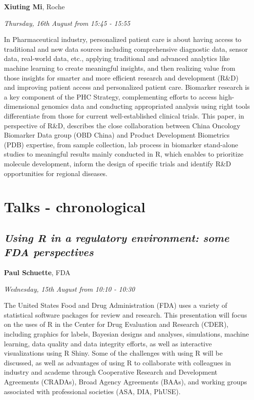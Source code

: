 \documentclass[]{book}
\theoremstyle{definition}
\theoremstyle{definition}
\theoremstyle{definition}
\theoremstyle{remark}
\begin{document}
\textbf{Xiuting Mi}, Roche

\emph{Thursday, 16th August from 15:45 - 15:55}

In Pharmaceutical industry, personalized patient care is about having
access to traditional and new data sources including comprehensive
diagnostic data, sensor data, real-world data, etc., applying
traditional and advanced analytics like machine learning to create
meaningful insights, and then realizing value from those insights for
smarter and more efficient research and development (R\&D) and improving
patient access and personalized patient care. Biomarker research is a
key component of the PHC Strategy, complementing efforts to access
high-dimensional genomics data and conducting appropriated analysis
using right tools differentiate from those for current well-established
clinical trials. This paper, in perspective of R\&D, describes the close
collaboration between China Oncology Biomarker Data group (OBD China)
and Product Development Biometrics (PDB) expertise, from sample
collection, lab process in biomarker stand-alone studies to meaningful
results mainly conducted in R, which enables to prioritize molecule
development, inform the design of specific trials and identify R\&D
opportunities for regional diseases.

\hypertarget{talks---chronological}{%
\chapter{Talks - chronological}\label{talks---chronological}}

\hypertarget{using-r-in-a-regulatory-environment-some-fda-perspectives-1}{%
\section{\texorpdfstring{\emph{Using R in a regulatory environment: some
FDA
perspectives}}{Using R in a regulatory environment: some FDA perspectives}}\label{using-r-in-a-regulatory-environment-some-fda-perspectives-1}}

\textbf{Paul Schuette}, FDA

\emph{Wednesday, 15th August from 10:10 - 10:30}

The United States Food and Drug Administration (FDA) uses a variety of
statistical software packages for review and research. This presentation
will focus on the uses of R in the Center for Drug Evaluation and
Research (CDER), including graphics for labels, Bayesian designs and
analyses, simulations, machine learning, data quality and data integrity
efforts, as well as interactive visualizations using R Shiny. Some of
the challenges with using R will be discussed, as well as advantages of
using R to collaborate with colleagues in industry and academe through
Cooperative Research and Development Agreements (CRADAs), Broad Agency
Agreements (BAAs), and working groups associated with professional
societies (ASA, DIA, PhUSE).
\end{document}
